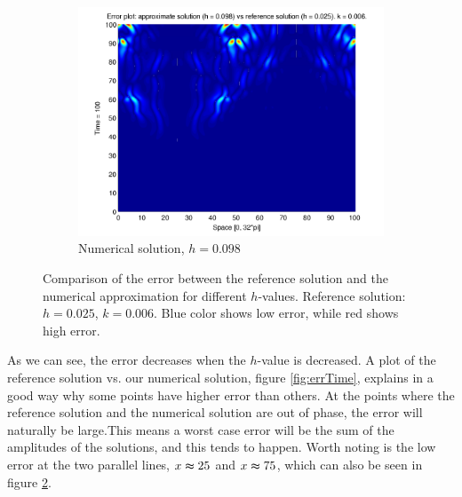 \begin{figure}[H]
\begin{subfigure}[b]{0.52\textwidth}
                \includegraphics[width=\textwidth]{../PDFs/IMEX/error_num_ref_t100_1st.pdf}
                \caption{Numerical solution, $h = 0.098$}
                \label{fig:lowError}
        \end{subfigure}
        \caption{Comparison of the error between the reference solution and the numerical approximation for different $h$-values. Reference solution: $h = 0.025$, $k = 0.006$. Blue color shows low error, while red shows high error.}\label{fig:errPlots}
\end{figure}

As we can see, the error decreases when the $h$-value is decreased. A plot of the reference solution vs. our numerical solution, figure \ref{fig:errTime}, explains in a good way why some points have higher error than others. At the points where the reference solution and the numerical solution are out of phase, the error will naturally be large.This means a worst case error will be the sum of the amplitudes of the solutions, and this tends to happen. Worth noting is the low error at the two parallel lines, $x \thickapprox 25$ and $x \thickapprox 75$, which can also be seen in figure \ref{fig:errPlots}. 

